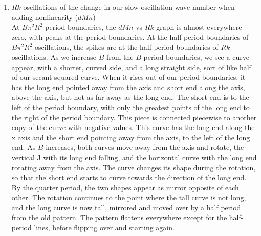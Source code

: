 \documentclass[11pt]{article}
\begin{document}
\begin{enumerate}
The oscillation starts at the period boundary as a tilted sine. At this
point, we switch to a piecewise function. Our old function continues to
tilt and look more and more like a sawtooth, but it is cut off by a
growing pattern with a quarter phase shift. The space the old function
takes up is symmetric around the midpoints of the oscillations, while
the new function, which take up the boundaries of the oscillation, start
as a sawtooth with the \(kR\) period boundaries as their midpoints. As
the portion of the graph this new pattern takes grows, the function
curves and the end falls. At the quarter \(kR\) period point, the
previous sawtooth piecewise function disappears and we are very close to
a negative sin function. Growth in \(kR\) causes the sine to grow and
tilt towards the axis. At the half \(kR\) period point, the two sides of
the tilted sine function split.\\
Each time when the new function grows, it doesn't look like a tilted
sine which has been cutoff, but rather has an additional curve near the
cutoff which tilts away from the x-axis. The old function which
disappears doesn't have this feature, and just looks like a cutoff
tilted sine. 
\item \(Rk\) oscillations of the change in our slow
oscillation wave number when adding nonlinearity (\(dMn\))\\
At \(B\pi^2R^2\) period boundaries, the \(dMn\) vs \(Rk\) graph is
almost everywhere zero, with peaks at the period boundaries. At the
half-period boundaries of \(B\pi^2R^2\) oscillations, the spikes are at
the half-period boundaries of \(Rk\) oscillations. As we increase \(B\)
from the \(B\) period boundaries, we see a curve appear, with a shorter,
curved side, and a long straight side, sort of like half of our secant
squared curve. When it rises out of our period boundaries, it has the
long end pointed away from the axis and short end along the axis, above
the axis, but not as far away as the long end. The short end is to the
left of the period boundary, with only the greatest points of the long
end to the right of the period boundary. This piece is connected
piecewise to another copy of the curve with negative values. This curve
has the long end along the x axis and the short end pointing away from
the axis, to the left of the long end. As \(B\) increases, both curves
move away from the axis and rotate, the vertical J with its long end
falling, and the horizontal curve with the long end rotating away from
the axis. The curve changes its shape during the rotation, so that the
short end starts to curve towards the direction of the long end. By the
quarter period, the two shapes appear as mirror opposite of each other.
The rotation continues to the point where the tall curve is not long,
and the long curve is now tall, mirrored and moved over by a half period
from the old pattern. The pattern flattens everywhere except for the
half-period lines, before flipping over and starting again.
\end{enumerate}
\end{document}
